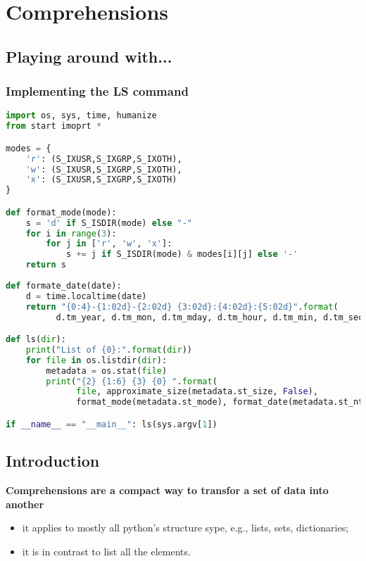 \section{Comprehensions}

\subsection{Playing around with...}

\subsubsection{Implementing the LS command}

\begin{lstlisting}[language=Python]
import os, sys, time, humanize
from start imoprt *

modes = { 
	'r': (S_IXUSR,S_IXGRP,S_IXOTH), 
	'w': (S_IXUSR,S_IXGRP,S_IXOTH), 
	'x': (S_IXUSR,S_IXGRP,S_IXOTH)
}

def format_mode(mode):
	s = 'd' if S_ISDIR(mode) else "-"
	for i in range(3):
		for j in ['r', 'w', 'x']:
			s += j if S_ISDIR(mode) & modes[i][j] else '-'
	return s
	
def formate_date(date):
	d = time.localtime(date)
	return "{0:4}-{1:02d}-{2:02d} {3:02d}:{4:02d}:{5:02d}".format(
          d.tm_year, d.tm_mon, d.tm_mday, d.tm_hour, d.tm_min, d.tm_sec)

def ls(dir):
	print("List of {0}:".format(dir))
	for file in os.listdir(dir):
		metadata = os.stat(file)
		print("{2} {1:6} {3} {0} ".format(
		      file, approximate_size(metadata.st_size, False),
		      format_mode(metadata.st_mode), format_date(metadata.st_ntime)))

if __name__ == "__main__": ls(sys.argv[1])
\end{lstlisting}

\subsection{Introduction}
\textbf{Comprehensions are a compact way to transfor a set of data into another}
\begin{itemize}
	\item it applies to mostly all python's structure sype, e.g., lists, sets, dictionaries;
	\item it is in contrast to list all the elements.
\end{itemize}

